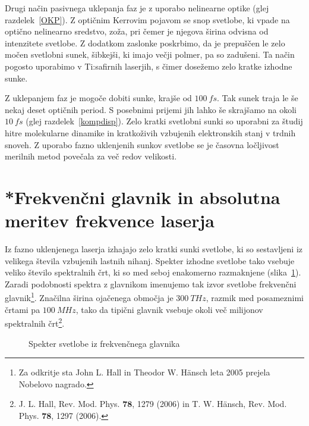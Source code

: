 Drugi način pasivnega uklepanja faz je z uporabo nelinearne optike 
(glej 
razdelek~\ref{OKP}). Z optičnim Kerrovim pojavom se snop svetlobe, ki vpade na 
optično nelinearno sredstvo, zoža, pri čemer je njegova širina odvisna od 
intenzitete svetlobe. Z dodatkom zaslonke poskrbimo, 
da je prepuščen le zelo močen svetlobni sunek, šibkejši, ki imajo večji polmer,
pa so zadušeni. Ta način pogosto
uporabimo v Ti:safirnih laserjih, s čimer dosežemo zelo
kratke izhodne sunke.

Z uklepanjem faz je mogoče dobiti sunke, krajše od $100~\si{fs}$. 
Tak sunek traja le še nekaj deset optičnih period. S posebnimi prijemi 
jih lahko še skrajšamo na okoli $10~\si{fs}$ (glej razdelek~\ref{kompdisp}). 
Zelo kratki svetlobni sunki so uporabni za študij hitre molekularne dinamike 
in kratkoživih vzbujenih elektronskih stanj v trdnih snoveh. Z uporabo fazno
uklenjenih sunkov svetlobe se je časovna ločljivost merilnih metod povečala za 
več redov velikosti.

\section{*Frekvenčni glavnik in absolutna meritev frekvence laserja}
Iz fazno uklenjenega laserja izhajajo zelo kratki sunki svetlobe, ki 
so sestavljeni iz velikega števila vzbujenih lastnih nihanj. Spekter 
izhodne svetlobe tako vsebuje veliko število spektralnih črt, ki
so med seboj enakomerno razmaknjene (slika~\ref{fig:comb}). Zaradi podobnosti spektra
z glavnikom imenujemo tak izvor svetlobe frekvenčni glavnik\footnote{Za odkritje 
sta John L. Hall in Theodor W. H\"ansch leta 2005 prejela 
Nobelovo nagrado.}. Značilna širina ojačenega
območja je $300~\si{THz}$, razmik med posameznimi črtami pa $100~\si{MHz}$, tako 
da tipični glavnik vsebuje okoli več milijonov spektralnih črt\footnote{
J. L. Hall, Rev. Mod. Phys. $\mathbf{78}$, 1279 (2006) in 
T. W. H\"ansch, Rev. Mod. Phys. $\mathbf{78}$, 1297 (2006).}. 
\begin{figure}[h]
\centering
\def\svgwidth{110truemm} 

\caption{Spekter svetlobe iz frekvenčnega glavnika}
\label{fig:comb}
\end{figure}

